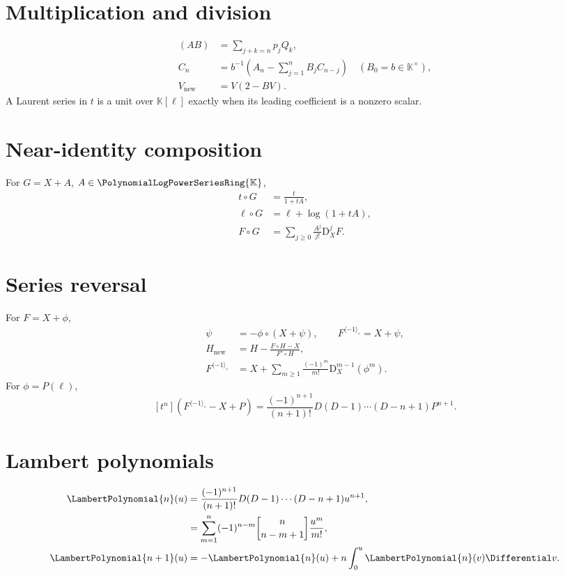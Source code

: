 \documentclass[11pt,oneside,openany]{book}
\newcommand{\K}{\mathbb{K}}
\newcommand{\Rring}{\PolynomialLogPowerSeriesRing{\K}}
\newcommand{\UnsignedStirlingFirstKind}[2]{%
  \genfrac{[}{]}{0pt}{}{#1}{#2}%
}
\newcommand{\compose}{\mathbin{\circ}}
\newcommand{\rev}{^{\langle-1\rangle_{\circ}}}
\newcommand{\D}{\mathrm{D}}
\begin{document}
\section{Multiplication and division}
\begin{align}
 [t^n](AB)&=\sum_{j+k=n}p_jQ_k,
 \label{eq:sheetmul}\\
 C_n&=b^{-1}\left(A_n-\sum_{j=1}^{n}B_jC_{n-j}\right)
 \quad(B_0=b\in\K^\times),
 \label{eq:sheetdiv}\\
 V_{\mathrm{new}}&=V(2-BV).
 \label{eq:sheetnewtonrecip}
\end{align}
A Laurent series in \(t\) is a unit over \(\K[\ell]\) exactly when its leading
coefficient is a nonzero scalar.

\section{Near-identity composition}
For \(G=X+A\), \(A\in\Rring\),
\begin{align}
 t\compose G&=\frac{t}{1+tA},
 \label{eq:sheettcompose}\\
 \ell\compose G&=\ell+\log(1+tA),
 \label{eq:sheetellcompose}\\
 F\compose G&=\sum_{j\geq0}\frac{A^j}{j!}\D_X^jF.
 \label{eq:sheettaylor}
\end{align}

\section{Series reversal}
For \(F=X+\phi\),
\begin{align}
 \psi&=-\phi\compose(X+\psi),
 \qquad F\rev=X+\psi,
 \label{eq:sheetfixedreverse}\\
 H_{\mathrm{new}}
 &=H-\frac{F\compose H-X}{F'\compose H},
 \label{eq:sheetnewtonreverse}\\
 F\rev
 &=X+\sum_{m\geq1}\frac{(-1)^m}{m!}
   \D_X^{m-1}(\phi^m).
 \label{eq:sheetlagrange}
\end{align}
For \(\phi=P(\ell)\),
\begin{equation}\label{eq:sheetPgeneral}
 [t^n](F\rev-X+P)
 =\frac{(-1)^{n+1}}{(n+1)!}
 D(D-1)\cdots(D-n+1)P^{n+1}.
\end{equation}

\section{Lambert polynomials}
\begin{align}
 \LambertPolynomial{n}(u)
 &=\frac{(-1)^{n+1}}{(n+1)!}
 D(D-1)\cdots(D-n+1)u^{n+1},
 \label{eq:sheetPnoperator}\\
 &=\sum_{m=1}^{n}(-1)^{n-m}
   \UnsignedStirlingFirstKind{n}{n-m+1}\frac{u^m}{m!},
 \label{eq:sheetPnstirling}\\
 \LambertPolynomial{n+1}(u)
 &=-\LambertPolynomial{n}(u)+n\int_0^u\LambertPolynomial{n}(v)\Differential v.
 \label{eq:sheetPnrec}
\end{align}
\end{document}
